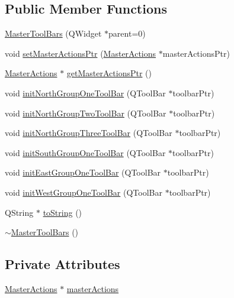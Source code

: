 \subsection*{Public Member Functions}
\begin{DoxyCompactItemize}
\item 
\hyperlink{class_master_tool_bars_a7f863d99c275bf1efe259281eb3245b0}{Master\-Tool\-Bars} (Q\-Widget $\ast$parent=0)
\item 
void \hyperlink{class_master_tool_bars_a8cc2c4f46779f429221b1dee8ad58181}{set\-Master\-Actions\-Ptr} (\hyperlink{class_master_actions}{Master\-Actions} $\ast$master\-Actions\-Ptr)
\item 
\hyperlink{class_master_actions}{Master\-Actions} $\ast$ \hyperlink{class_master_tool_bars_ae73d5e7f4b317e7402ed0b7f6e405fb9}{get\-Master\-Actions\-Ptr} ()
\item 
void \hyperlink{class_master_tool_bars_aec0df27e89d0bbcf5c7b5fc7d2fa8195}{init\-North\-Group\-One\-Tool\-Bar} (Q\-Tool\-Bar $\ast$toolbar\-Ptr)
\item 
void \hyperlink{class_master_tool_bars_a6b77ec9af9c57217657689b6564f1a54}{init\-North\-Group\-Two\-Tool\-Bar} (Q\-Tool\-Bar $\ast$toolbar\-Ptr)
\item 
void \hyperlink{class_master_tool_bars_a058d8e043fc2d5303e21f993c48bc581}{init\-North\-Group\-Three\-Tool\-Bar} (Q\-Tool\-Bar $\ast$toolbar\-Ptr)
\item 
void \hyperlink{class_master_tool_bars_a3f8d953232c3c8ad2205913514a7233e}{init\-South\-Group\-One\-Tool\-Bar} (Q\-Tool\-Bar $\ast$toolbar\-Ptr)
\item 
void \hyperlink{class_master_tool_bars_ad17aa8fcdbbbc16c67075b5b06db146e}{init\-East\-Group\-One\-Tool\-Bar} (Q\-Tool\-Bar $\ast$toolbar\-Ptr)
\item 
void \hyperlink{class_master_tool_bars_a12bb3e3171d9ea6a6c9cd9c7b800e0d7}{init\-West\-Group\-One\-Tool\-Bar} (Q\-Tool\-Bar $\ast$toolbar\-Ptr)
\item 
Q\-String $\ast$ \hyperlink{class_master_tool_bars_a4ebe3402c96206baf23a64f2570bf6cc}{to\-String} ()
\item 
\hyperlink{class_master_tool_bars_abde16b63edfa107a7125dee5f9c435be}{$\sim$\-Master\-Tool\-Bars} ()
\end{DoxyCompactItemize}
\subsection*{Private Attributes}
\begin{DoxyCompactItemize}
\item 
\hyperlink{class_master_actions}{Master\-Actions} $\ast$ \hyperlink{class_master_tool_bars_a1adde6a67eaa64fbbbf65ffcb8c1590f}{master\-Actions}
\end{DoxyCompactItemize}


